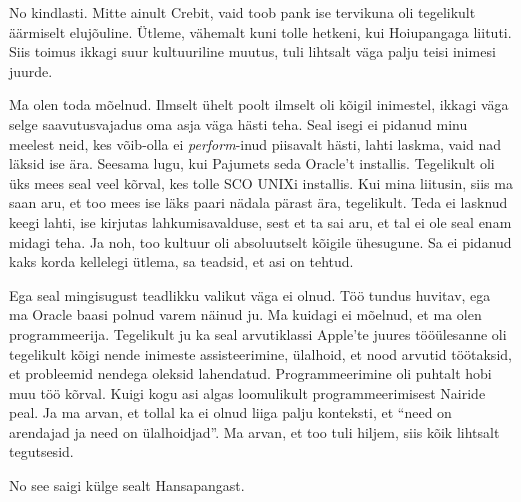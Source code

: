 
No kindlasti. Mitte ainult Crebit, vaid toob pank ise tervikuna oli tegelikult 
äärmiselt elujõuline. Ütleme, vähemalt kuni tolle hetkeni, kui
Hoiupangaga liituti. Siis toimus ikkagi suur kultuuriline 
muutus, tuli lihtsalt väga palju teisi inimesi juurde.


Ma olen toda mõelnud. Ilmselt ühelt poolt ilmselt oli kõigil inimestel, 
ikkagi väga selge saavutusvajadus oma asja väga hästi teha. Seal 
isegi ei pidanud minu meelest neid, kes võib-olla ei \emph{perform}-inud 
piisavalt hästi, lahti laskma, vaid nad läksid ise ära. Seesama lugu, kui  
Pajumets seda Oracle't installis. 
Tegelikult oli üks mees seal veel kõrval, kes tolle SCO UNIXi installis. 
Kui mina liitusin, siis ma saan aru, et too mees ise läks paari nädala pärast 
ära, tegelikult. Teda ei lasknud keegi lahti, ise kirjutas lahkumisavalduse, 
sest et ta sai aru, et tal ei ole seal enam midagi teha. Ja noh, too kultuur 
oli absoluutselt kõigile ühesugune. Sa ei pidanud kaks korda kellelegi ütlema, 
sa teadsid, et asi on tehtud.


Ega seal mingisugust  teadlikku valikut väga ei olnud. Töö tundus huvitav, ega 
ma Oracle baasi polnud varem näinud ju. Ma kuidagi ei mõelnud, et ma olen 
programmeerija. Tegelikult ju ka seal arvutiklassi Apple'te juures  tööülesanne 
oli tegelikult kõigi nende inimeste assisteerimine, ülalhoid, et nood arvutid 
töötaksid, et probleemid nendega oleksid lahendatud. Programmeerimine oli 
puhtalt hobi muu töö kõrval. Kuigi kogu asi algas loomulikult 
programmeerimisest Nairide peal. Ja ma arvan, et tollal ka ei olnud liiga palju 
konteksti, et \enquote{need on arendajad ja need on ülalhoidjad}. Ma arvan, et 
too tuli hiljem, siis kõik lihtsalt tegutsesid.


No see saigi külge sealt Hansapangast. 


